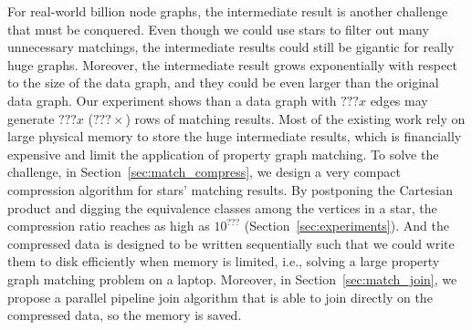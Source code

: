 For real-world billion node graphs, the intermediate result is another challenge that must be conquered.
Even though we could use stars to filter out many unnecessary matchings,
the intermediate results could still be gigantic for really huge graphs.
Moreover, the intermediate result grows exponentially with respect to the size of the data graph,
and they could be even larger than the original data graph.
Our experiment shows than a data graph with $???x$ edges may generate $???x$ ($???\times$) rows of matching results.
Most of the existing work rely on large physical memory to store the huge intermediate results,
which is financially expensive and limit the application of property graph matching.
To solve the challenge, in Section~\ref{sec:match_compress}, we design a very compact compression algorithm for stars' matching results.
By postponing the Cartesian product and digging the equivalence classes among the vertices in a star,
the compression ratio reaches as high as $10^{???}$ (Section~\ref{sec:experiments}).
And the compressed data is designed to be written sequentially such that we could write them to disk efficiently when memory is limited, i.e., solving a large property graph matching problem on a laptop.
Moreover, in Section~\ref{sec:match_join}, we propose a parallel pipeline join algorithm that is able to join directly on the compressed data, so the memory is saved.

